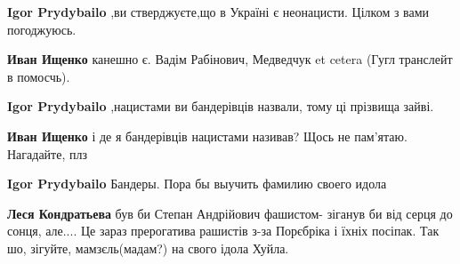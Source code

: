 \begin{itemize}
\begin{itemize}
 
\textbf{Igor Prydybailo} ,ви стверджуєте,що в Україні є неонацисти. Цілком з вами погоджуюсь.

 
\textbf{Иван Ищенко} канешно є. Вадім Рабінович, Медведчук et cetera (Гугл транслейт в помосчь).

 
\textbf{Igor Prydybailo} ,нацистами ви бандерівців назвали, тому ці прізвища зайві.

 
\textbf{Иван Ищенко} і де я бандерівців нацистами називав? Щось не пам'ятаю. Нагадайте, плз

 
\textbf{Igor Prydybailo} Бандеры. Пора бы выучить фамилию своего идола

 
\textbf{Леся Кондратьева} був би Степан Андрійович фашистом- зіганув би від серця до сонця, але.... Це зараз прерогатива рашистів з-за Порєбріка і їхніх посіпак.
Так шо, зігуйте, мамзєль(мадам?) на свого ідола Хуйла.


\end{itemize}
\end{itemize}
